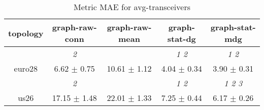 \begin{table}[h]
\caption{Metric MAE for avg-transceivers}

        \centering
        \begin{tabular}{
        ccccc} \toprule 
 topology& graph-raw-conn & graph-raw-mean & graph-stat-dg & graph-stat-mdg \\ \toprule
 & \cellcolor[HTML]{EFEFEF} \textit{ 2 }& \cellcolor[HTML]{EFEFEF} & \cellcolor[HTML]{EFEFEF} \textit{ 1 2 }& \cellcolor[HTML]{EFEFEF} \textit{ 1 2 } \\ 
 {euro28}& \cellcolor[HTML]{EFEFEF} 6.62 $\pm$ 0.75& \cellcolor[HTML]{EFEFEF} 10.61 $\pm$ 1.12& \cellcolor[HTML]{EFEFEF} 4.04 $\pm$ 0.34& \cellcolor[HTML]{EFEFEF} 3.90 $\pm$ 0.31 \\ 
& \cellcolor[HTML]{EFEFEF} \textit{ 2 }& \cellcolor[HTML]{EFEFEF} & \cellcolor[HTML]{EFEFEF} \textit{ 1 2 }& \cellcolor[HTML]{EFEFEF} \textit{ 1 2 3 } \\ 
 {us26}& \cellcolor[HTML]{EFEFEF} 17.15 $\pm$ 1.48& \cellcolor[HTML]{EFEFEF} 22.01 $\pm$ 1.33& \cellcolor[HTML]{EFEFEF} 7.25 $\pm$ 0.44& \cellcolor[HTML]{EFEFEF} 6.17 $\pm$ 0.26 \\ 

        \bottomrule
        \end{tabular}%

        \end{table}
        
